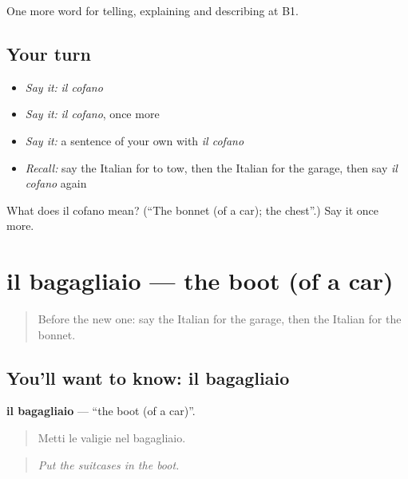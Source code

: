 \begin{grammarlens}[title={What you've built}]
One more word for telling, explaining and describing at B1.
\end{grammarlens}

\subsection*{Your turn}
\begin{itemize}
\raggedright
  \item \emph{Say it:} \emph{il cofano}
  \item \emph{Say it:} \emph{il cofano}, once more
  \item \emph{Say it:} a sentence of your own with \emph{il cofano}
  \item \emph{Recall:} say the Italian for to tow, then the Italian for the garage, then say \emph{il cofano} again
\end{itemize}

\begin{tcolorbox}[breakable,colback=teal!4,colframe=teal!35!black,title={Before you move on}]
What does il cofano mean? (\textquotedblleft{}The bonnet (of a car); the chest\textquotedblright{}.) Say it once more.
\end{tcolorbox}
\section[il bagagliaio]{il bagagliaio — the boot (of a car)}

\label{lesson:IT-C411-bagagliaio}



\begin{quote}
Before the new one: say the Italian for the garage, then the Italian for the bonnet.
\end{quote}

\subsection*{You'll want to know: il bagagliaio}
\textbf{il bagagliaio} — \textquotedblleft{}the boot (of a car)\textquotedblright{}.

\begin{quote}
Metti le valigie nel bagagliaio.
\end{quote}

\begin{quote}
\emph{Put the suitcases in the boot.}
\end{quote}

